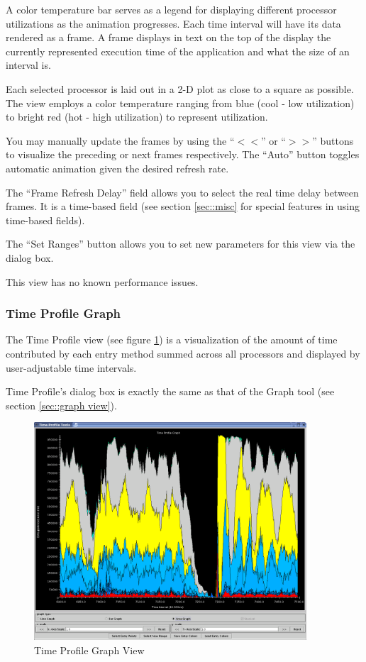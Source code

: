 \documentclass[10pt]{article}
\begin{document}
A color temperature bar serves as a legend for displaying different
processor utilizations as the animation progresses. Each time interval
will have its data rendered as a frame. A frame displays in text on
the top of the display the currently represented execution time of the
application and what the size of an interval is.

Each selected processor is laid out in a 2-D plot as close to a square
as possible. The view employs a color temperature ranging from blue
(cool - low utilization) to bright red (hot - high utilization) to
represent utilization.

You may manually update the frames by using the ``$<<$'' or ``$>>$''
buttons to visualize the preceding or next frames respectively. The
``Auto'' button toggles automatic animation given the desired refresh
rate.

The ``Frame Refresh Delay'' field allows you to select the real time
delay between frames. It is a time-based field (see section
\ref{sec::misc} for special features in using time-based
fields).

The ``Set Ranges'' button allows you to set new parameters for this
view via the dialog box.

This view has no known performance issues.

\subsubsection{Time Profile Graph}

The Time Profile view (see figure \ref{time profile}) is a
visualization of the amount of time contributed by each entry method
summed across all processors and displayed by user-adjustable time
intervals.

Time Profile's dialog box is exactly the same as that of the Graph
tool (see section \ref{sec::graph view}).

\begin{figure}[htb]
\center
\includegraphics[width=4.0in]{fig/timeprofile}
\caption{Time Profile Graph View}
\label{time profile}
\end{figure}
\end{document}
